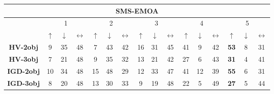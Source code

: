 \begin{table}[t]
\begin{tabular}{|c|c|c|c|c|c|c|c|c|c|c|c|c|c|c|c|}
\hline
\hline
\multicolumn{16}{|c|}{SMS-EMOA} \\ \hline
 & \multicolumn{3}{c|}{1} & \multicolumn{3}{c|}{2} & \multicolumn{3}{c|}{3} & \multicolumn{3}{c|}{4} & \multicolumn{3}{c|}{5} \\ \hline
 & $\uparrow$ & $\downarrow$ & $\longleftrightarrow$ & $\uparrow$ & $\downarrow$ & $\longleftrightarrow$ & $\uparrow$ & $\downarrow$ & $\longleftrightarrow$ & $\uparrow$ & $\downarrow$ & $\longleftrightarrow$ & $\uparrow$ & $\downarrow$ & $\longleftrightarrow$ \\ \hline
\textbf{HV-2obj} & 9 & 35 & 48 & 7 & 43 & 42 & 16 & 31 & 45 & 41 & 9 & 42 & \textbf{53} & 8 & 31 \\ \hline
\textbf{HV-3obj} & 7 & 21 & 48 & 9 & 35 & 32 & 13 & 21 & 42 & 27 & 6 & 43 & \textbf{31} & 4 & 41 \\ \hline
\textbf{IGD-2obj} & 10 & 34 & 48 & 15 & 48 & 29 & 12 & 33 & 47 & 41 & 12 & 39 & \textbf{55} & 6 & 31 \\ \hline
\textbf{IGD-3obj} & 8 & 20 & 48 & 13 & 30 & 33 & 9 & 19 & 48 & 22 & 5 & 49 & \textbf{27} & 5 & 44 \\ \hline
\end{tabular}
\end{table}

